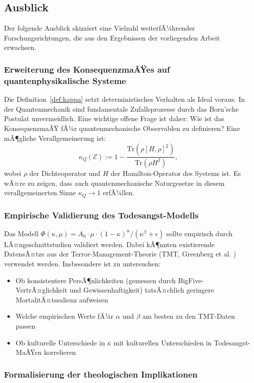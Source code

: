 ﻿\documentclass[a4paper,12pt]{article}
\theoremstyle{definition}
\begin{document}
\subsection{Ausblick}

Der folgende Ausblick skizziert eine Vielzahl weiterfÃ¼hrender Forschungsrichtungen, die aus den Ergebnissen der vorliegenden Arbeit erwachsen.

\subsubsection{Erweiterung des KonsequenzmaÃŸes auf quantenphysikalische Systeme}

Die Definition~\ref{def:kappa} setzt deterministisches Verhalten als Ideal voraus. In der Quantenmechanik sind fundamentale Zufallsprozesse durch das Born'sche Postulat unvermeidlich. Eine wichtige offene Frage ist daher: Wie ist das KonsequenzmaÃŸ fÃ¼r quantenmechanische Observablen zu definieren? Eine mÃ¶gliche Verallgemeinerung ist:
\[
\kappa_Q(\mathcal{E}) := 1 - \frac{\text{Tr}(\rho [H, \rho]^2)}{\text{Tr}(\rho H^2)},
\]
wobei $\rho$ der Dichteoperator und $H$ der Hamilton-Operator des Systems ist. Es wÃ¤re zu zeigen, dass auch quantenmechanische Naturgesetze in diesem verallgemeinerten Sinne $\kappa_Q \to 1$ erfÃ¼llen.

\subsubsection{Empirische Validierung des Todesangst-Modells}

Das Modell $\Phi(\kappa, \mu) = A_0 \cdot \mu \cdot (1-\kappa)^\alpha / (\kappa^\beta + \epsilon)$ sollte empirisch durch LÃ¤ngsschnittstudien validiert werden. Dabei kÃ¶nnten existierende DatensÃ¤tze aus der Terror-Management-Theorie (TMT, Greenberg et al. \cite{greenberg1986}) verwendet werden. Insbesondere ist zu untersuchen:
\begin{itemize}
\item Ob konsistentere PersÃ¶nlichkeiten (gemessen durch BigFive-VertrÃ¤glichkeit und Gewissenhaftigkeit) tatsÃ¤chlich geringere MortalitÃ¤tssalienz aufweisen
\item Welche empirischen Werte fÃ¼r $\alpha$ und $\beta$ am besten zu den TMT-Daten passen
\item Ob kulturelle Unterschiede in $\bar{\kappa}$ mit kulturellen Unterschieden in Todesangst-MaÃŸen korrelieren
\end{itemize}

\subsubsection{Formalisierung der theologischen Implikationen}
\end{document}
